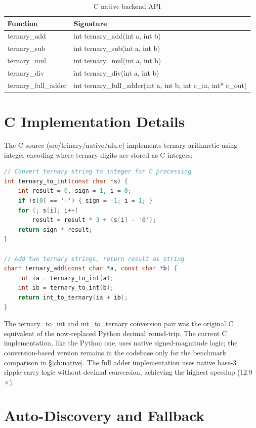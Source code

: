 \documentclass[12pt,a4paper,twoside]{book}
\theoremstyle{trinarytheorem}
\theoremstyle{trinarydefinition}
\newcommand{\code}[1]{\textsf{#1}}
\begin{document}
\begin{table}[H]
\centering
\caption{C native backend API}
\label{tab:nativeapi}
\begin{tabular}{ll}
\toprule
Function & Signature \\
\midrule
\code{ternary\_add} & int ternary\_add(int a, int b) \\
\code{ternary\_sub} & int ternary\_sub(int a, int b) \\
\code{ternary\_mul} & int ternary\_mul(int a, int b) \\
\code{ternary\_div} & int ternary\_div(int a, int b) \\
\code{ternary\_full\_adder} & int ternary\_full\_adder(int a, int b, int c\_in, int* c\_out) \\
\bottomrule
\end{tabular}
\end{table}

\section{C Implementation Details}

The C source (\code{src/trinary/native/alu.c}) implements ternary arithmetic
using integer encoding where ternary digits are stored as C integers:

\begin{lstlisting}[language=C]
// Convert ternary string to integer for C processing
int ternary_to_int(const char *s) {
    int result = 0, sign = 1, i = 0;
    if (s[0] == '-') { sign = -1; i = 1; }
    for (; s[i]; i++)
        result = result * 3 + (s[i] - '0');
    return sign * result;
}

// Add two ternary strings, return result as string
char* ternary_add(const char *a, const char *b) {
    int ia = ternary_to_int(a);
    int ib = ternary_to_int(b);
    return int_to_ternary(ia + ib);
}
\end{lstlisting}

The \code{ternary\_to\_int} and \code{int\_to\_ternary} conversion pair was
the original C equivalent of the now-replaced Python decimal round-trip. The
current C implementation, like the Python one, uses native signed-magnitude
logic; the conversion-based version remains in the codebase only for the
benchmark comparison in \S\ref{ch:native}. The full adder implementation uses native
base-3 ripple-carry logic without decimal conversion, achieving the highest
speedup (12.9$\times$).

\section{Auto-Discovery and Fallback}
\end{document}
